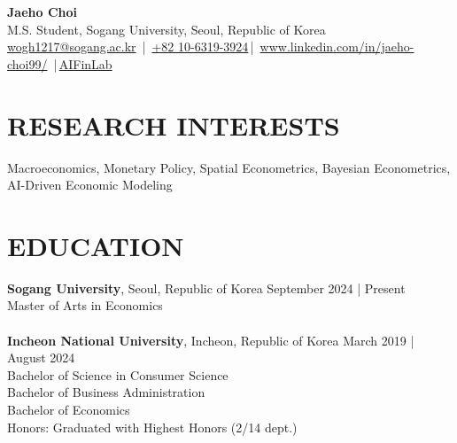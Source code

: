 \documentclass[a4paper,9pt]{extarticle}
\begin{document}
\pagestyle{fancy}
\renewcommand{\headrulewidth}{0pt}
\fancyhead{}
\thispagestyle{empty} %

\begin{flushleft}
\textbf{\LARGE Jaeho Choi}\\[2pt] %
M.S. Student, Sogang University, Seoul, Republic of Korea
\\ \href{mailto:wogh1217@sogang.ac.kr}{wogh1217@sogang.ac.kr} \,|\, \href{tel:+821063193924}{+82 10-6319-3924}\,|\,
\href{https://www.linkedin.com/in/jaeho-choi99/}{www.linkedin.com/in/jaeho-choi99/} \,|\,\href{https://sc.sogang.ac.kr/aifinlab/}{AIFinLab} %
\end{flushleft}

\section*{RESEARCH INTERESTS}
\noindent
Macroeconomics, Monetary Policy, Spatial Econometrics, Bayesian Econometrics, AI-Driven Economic Modeling
\section*{EDUCATION}
\noindent
\textbf{Sogang University}, Seoul, Republic of Korea \hfill September 2024 | Present\\
Master of Arts in Economics\\

\noindent\\
\textbf{Incheon National University}, Incheon, Republic of Korea \hfill March 2019 | August 2024\\
Bachelor of Science in Consumer Science\\
Bachelor of Business Administration\\
Bachelor of Economics\\
Honors: Graduated with Highest Honors (2/14 dept.)


\end{document}
